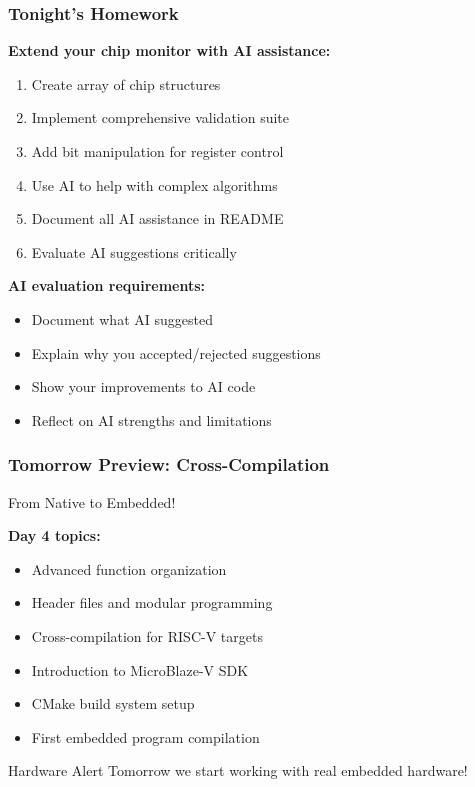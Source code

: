 \documentclass{beamer}
\begin{document}
\begin{frame}
\frametitle{Tonight's Homework}
\textbf{Extend your chip monitor with AI assistance:}
\begin{enumerate}
    \item Create array of chip structures
    \item Implement comprehensive validation suite
    \item Add bit manipulation for register control
    \item Use AI to help with complex algorithms
    \item Document all AI assistance in README
    \item Evaluate AI suggestions critically
\end{enumerate}

\vspace{0.5cm}
\textbf{AI evaluation requirements:}
\begin{itemize}
    \item Document what AI suggested
    \item Explain why you accepted/rejected suggestions
    \item Show your improvements to AI code
    \item Reflect on AI strengths and limitations
\end{itemize}
\end{frame}

\begin{frame}
\frametitle{Tomorrow Preview: Cross-Compilation}
\begin{center}
\Large From Native to Embedded!
\end{center}

\textbf{Day 4 topics:}
\begin{itemize}
    \item Advanced function organization
    \item Header files and modular programming
    \item Cross-compilation for RISC-V targets
    \item Introduction to MicroBlaze-V SDK
    \item CMake build system setup
    \item First embedded program compilation
\end{itemize}

\vspace{0.5cm}
\begin{alertblock}{Hardware Alert}
Tomorrow we start working with real embedded hardware!
\end{alertblock}
\end{frame}
\end{document}
